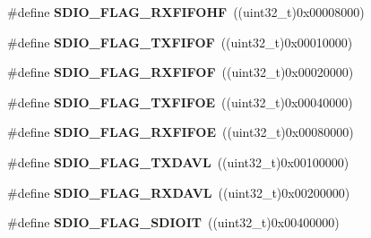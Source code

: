 \begin{DoxyCompactItemize}
\item 
\hypertarget{group___s_d_i_o___flags_ga8c5942ae3df21efad2d7c61a46015758}{\#define {\bfseries S\-D\-I\-O\-\_\-\-F\-L\-A\-G\-\_\-\-R\-X\-F\-I\-F\-O\-H\-F}~((uint32\-\_\-t)0x00008000)}\label{group___s_d_i_o___flags_ga8c5942ae3df21efad2d7c61a46015758}

\item 
\hypertarget{group___s_d_i_o___flags_gad3ca936300ef251639a4cfbe2f63b6b8}{\#define {\bfseries S\-D\-I\-O\-\_\-\-F\-L\-A\-G\-\_\-\-T\-X\-F\-I\-F\-O\-F}~((uint32\-\_\-t)0x00010000)}\label{group___s_d_i_o___flags_gad3ca936300ef251639a4cfbe2f63b6b8}

\item 
\hypertarget{group___s_d_i_o___flags_gaf92cb783f000b8d946fe8ace81b51df2}{\#define {\bfseries S\-D\-I\-O\-\_\-\-F\-L\-A\-G\-\_\-\-R\-X\-F\-I\-F\-O\-F}~((uint32\-\_\-t)0x00020000)}\label{group___s_d_i_o___flags_gaf92cb783f000b8d946fe8ace81b51df2}

\item 
\hypertarget{group___s_d_i_o___flags_gac41ef05773abad79b4b0c443a77733db}{\#define {\bfseries S\-D\-I\-O\-\_\-\-F\-L\-A\-G\-\_\-\-T\-X\-F\-I\-F\-O\-E}~((uint32\-\_\-t)0x00040000)}\label{group___s_d_i_o___flags_gac41ef05773abad79b4b0c443a77733db}

\item 
\hypertarget{group___s_d_i_o___flags_ga59ea7e2dc22df742053c5e525b98599d}{\#define {\bfseries S\-D\-I\-O\-\_\-\-F\-L\-A\-G\-\_\-\-R\-X\-F\-I\-F\-O\-E}~((uint32\-\_\-t)0x00080000)}\label{group___s_d_i_o___flags_ga59ea7e2dc22df742053c5e525b98599d}

\item 
\hypertarget{group___s_d_i_o___flags_ga9c6620d6b16b6af19d3e14f40e688631}{\#define {\bfseries S\-D\-I\-O\-\_\-\-F\-L\-A\-G\-\_\-\-T\-X\-D\-A\-V\-L}~((uint32\-\_\-t)0x00100000)}\label{group___s_d_i_o___flags_ga9c6620d6b16b6af19d3e14f40e688631}

\item 
\hypertarget{group___s_d_i_o___flags_ga7558b354658171bb6aa1b6f1e16d8e21}{\#define {\bfseries S\-D\-I\-O\-\_\-\-F\-L\-A\-G\-\_\-\-R\-X\-D\-A\-V\-L}~((uint32\-\_\-t)0x00200000)}\label{group___s_d_i_o___flags_ga7558b354658171bb6aa1b6f1e16d8e21}

\item 
\hypertarget{group___s_d_i_o___flags_gae888ec1c9885c35a5f8e01bcffe324a1}{\#define {\bfseries S\-D\-I\-O\-\_\-\-F\-L\-A\-G\-\_\-\-S\-D\-I\-O\-I\-T}~((uint32\-\_\-t)0x00400000)}\label{group___s_d_i_o___flags_gae888ec1c9885c35a5f8e01bcffe324a1}


\end{DoxyCompactItemize}
